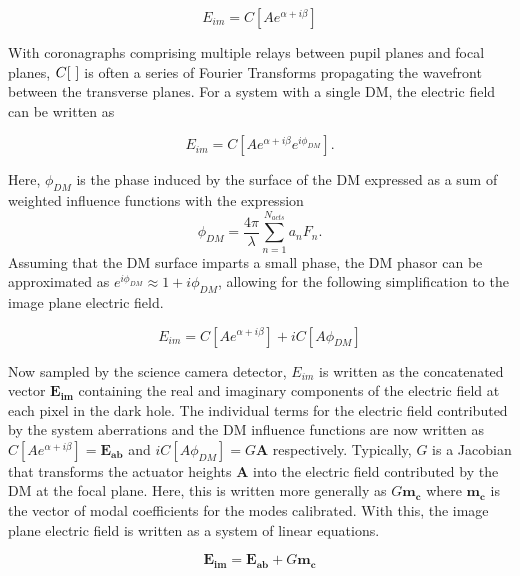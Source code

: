 \documentclass[12pt]{spieman}  %
\begin{document}
\begin{spacing}{2}
\begin{equation}
    \label{eq:efc-1}
    E_{im} = C[Ae^{\alpha + i\beta}]
\end{equation}

With coronagraphs comprising multiple relays between pupil planes and focal planes, $C[\text{\space}]$ is often a series of Fourier Transforms propagating the wavefront between the transverse planes. For a system with a single DM, the electric field can be written as 

\begin{equation}
    \label{eq:efc-2}
    E_{im} = C[Ae^{\alpha + i\beta}e^{i\phi_{DM}}]\text{.}
\end{equation}

\noindent Here, $\phi_{DM}$ is the phase induced by the surface of the DM expressed as a sum of weighted influence functions with the expression \begin{equation}
    \phi_{DM} = \frac{4\pi}{\lambda}\sum_{n=1}^{N_{acts}} a_n F_n\text{.} 
\end{equation} Assuming that the DM surface imparts a small phase, the DM phasor can be approximated as $e^{i\phi_{DM}} \approx 1 + i\phi_{DM}$, allowing for the following simplification to the image plane electric field.

\begin{equation}
    \label{eq:efc-3}
    E_{im} = C[Ae^{\alpha + i\beta}] + iC[A\phi_{DM}]
\end{equation}

Now sampled by the science camera detector,  $E_{im}$ is written as the concatenated vector $\mathbf{E_{im}}$ containing the real and imaginary components of the electric field at each pixel in the dark hole. The individual terms for the electric field contributed by the system aberrations and the DM influence functions are now written as $C[Ae^{\alpha + i\beta}] = \mathbf{E_{ab}}$ and $iC[A\phi_{DM}] = G\mathbf{A}$ respectively. Typically, $G$ is a Jacobian that transforms the actuator heights $\mathbf{A}$ into the electric field contributed by the DM at the focal plane. Here, this is written more generally as $G\mathbf{m_c}$ where $\mathbf{m_c}$ is the vector of modal coefficients for the modes calibrated. With this, the image plane electric field is written as a system of linear equations. 

\begin{equation}
    \label{eq:efc-3}
    \mathbf{E_{im}} = \mathbf{E_{ab}} + G \mathbf{m_c}
\end{equation}


\end{spacing}
\end{document}
